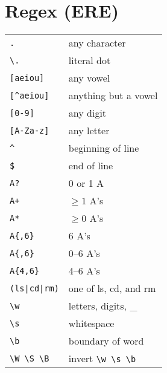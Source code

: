 \documentclass[a4paper, twocolumn]{article}
\begin{document}
\section{Regex (ERE)}
\begin{tabular}{ll}
    \verb|.|            & any character                             \\
    \verb|\.|           & literal dot                               \\
    \verb|[aeiou]|      & any vowel                                 \\
    \verb|[^aeiou]|     & anything but a vowel                      \\
    \verb|[0-9]|        & any digit                                 \\
    \verb|[A-Za-z]|     & any letter                                \\
    \verb|^|            & beginning of line                         \\
    \verb|$|            & end of line                               \\
    \verb|A?|           & 0 or 1 A                                  \\
    \verb|A+|           & $\ge 1$ A's                               \\
    \verb|A*|           & $\ge 0$ A's                               \\
    \verb|A{,6}|        & 6 A's                                     \\
    \verb|A{,6}|        & 0--6 A's                                  \\
    \verb|A{4,6}|       & 4--6 A's                                  \\
    \verb!(ls|cd|rm)!   & one of ls, cd, and rm                     \\
    \verb|\w|           & letters, digits, \_                       \\
    \verb|\s|           & whitespace                                \\
    \verb|\b|           & boundary of word                          \\
    \verb|\W \S \B|     & invert \verb|\w \s \b|
\end{tabular}
\end{document}
